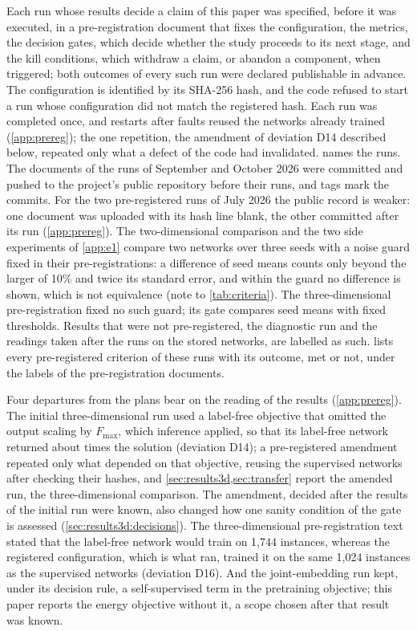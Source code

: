 Each run whose results decide a claim of this paper was specified, before it was executed,
in a pre-registration document that fixes the configuration, the metrics, the decision
gates, which decide whether the study proceeds to its next stage, and the kill conditions,
which withdraw a claim, or abandon a component, when triggered; both outcomes of every such
run were declared publishable in advance. The configuration is identified by its SHA-256
hash, and the code refused to start a run whose configuration did not match the registered
hash. Each run was completed once, and restarts after faults reused the networks already
trained (\ref{app:prereg}); the one repetition, the amendment of deviation D14 described
below, repeated only what a defect of the code had invalidated.  names the
runs. The documents of the runs of September and October 2026 were committed and pushed to
the project's public repository before their runs, and tags mark the commits. For the two
pre-registered runs of July 2026 the public record is weaker: one document was uploaded
with its hash line blank, the other committed after its run (\ref{app:prereg}).
The two-dimensional comparison and the two side experiments of \ref{app:e1} compare two
networks over three seeds with a noise guard fixed in their pre-registrations: a difference
of seed means counts only beyond the larger of 10\% and twice its standard error, and within
the guard no difference is shown, which is not equivalence (note to \cref{tab:criteria}).
The three-dimensional pre-registration fixed no such guard; its gate compares seed means
with fixed thresholds. Results that were not pre-registered, the
diagnostic run and the readings taken after the runs on the stored networks, are labelled
as such.  lists every pre-registered criterion of these runs with its
outcome, met or not, under the labels of the pre-registration documents.

Four departures from the plans bear on the reading of the results (\ref{app:prereg}). The
initial three-dimensional run used a label-free objective that omitted the output scaling
by $F_{\max}$, which inference applied, so that its label-free network returned about
\numDfourteenAlpha{} times the solution (deviation D14); a pre-registered amendment
repeated only what depended on that objective, reusing the supervised networks after
checking their hashes, and \cref{sec:results3d,sec:transfer} report the amended run, the
three-dimensional comparison. The amendment, decided after the results of the initial run
were known, also changed how one sanity condition of the gate is assessed
(\cref{sec:results3d:decisions}). The three-dimensional pre-registration text stated that the
label-free network would train on 1,744 instances, whereas the registered configuration,
which is what ran, trained it on the same 1,024 instances as the supervised networks
(deviation D16). And the joint-embedding run kept, under its decision rule, a
self-supervised term in the pretraining objective; this paper reports the energy objective
without it, a scope chosen after that result was known.
